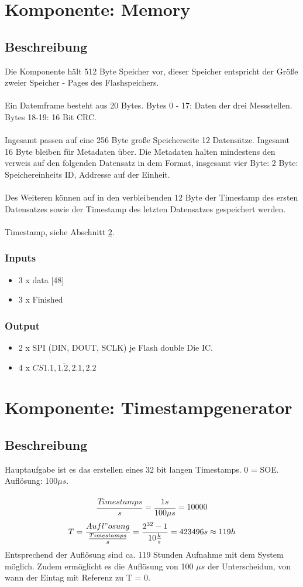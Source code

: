 \section{Komponente: Memory}
\subsection{Beschreibung}
Die Komponente hält 512 Byte Speicher vor, dieser Speicher entspricht der Größe zweier Speicher - Pages des Flashspeichers. \\\\
Ein Datemframe besteht aus 20 Bytes. Bytes 0 - 17: Daten der drei Messstellen. Bytes 18-19: 16 Bit CRC. \\\\
Ingesamt passen auf eine 256 Byte große Speicherseite 12 Datensätze. Ingesamt 16 Byte bleiben für Metadaten über. Die Metadaten halten mindestens den verweis auf den folgenden Datensatz in dem Format, insgesamt vier Byte: 2 Byte: Speichereinheits ID, Addresse auf der Einheit. \\\\
Des Weiteren können auf in den verbleibenden 12 Byte der Timestamp des ersten Datensatzes sowie der Timestamp des letzten Datensatzes gespeichert werden. \\\\
Timestamp, siehe Abschnitt \ref{timestamp}.
\subsubsection{Inputs}
\begin{itemize}
\item 3 x data [48] 
\item 3 x Finished 
\end{itemize}
\subsubsection{Output}
\begin{itemize}
\item 2 x SPI (DIN, DOUT, SCLK) je Flash double Die IC. 
\item 4 x $\overline{CS1.1, 1.2,  2.1, 2.2}$   
\end{itemize}
\section{Komponente: Timestampgenerator} 
\label{timestamp}
\subsection{Beschreibung}
Hauptaufgabe ist es das erstellen eines 32 bit langen Timestamps. 0 = SOE. Auflösung: 100$\mu s$. \\\\
$$\frac{Timestamps}{s} = \frac{1 s}{100 \mu s} = 10000$$
$$T = \frac{Aufl"osung}{\frac{Timestamps}{s}} = \frac{2^{32} - 1}{10\frac{k}{s}} = 423496s \approx 119h$$
Entsprechend der Auflösung sind ca. 119 Stunden Aufnahme mit dem System möglich. Zudem ermöglicht es die Auflösung von 100 $\mu s$ der Unterscheidun, von wann der Eintag mit Referenz zu T = 0.
